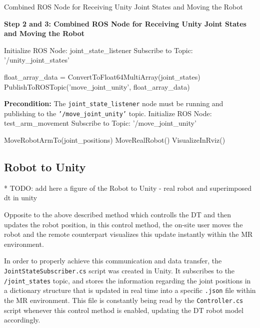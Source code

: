 \begin{algorithm}
    \caption{Combined ROS Node for Receiving Unity Joint States and Moving the Robot}\label{alg:combined_ros_node}
    \begin{algorithmic}[1]
        \State \textbf{Step 2 and 3: Combined ROS Node for Receiving Unity Joint States and Moving the Robot}
        
        \State Initialize ROS Node: joint\_state\_listener
        \State Subscribe to Topic: '/unity\_joint\_states'
        
            \State float\_array\_data = ConvertToFloat64MultiArray(joint\_states)
            \State PublishToROSTopic('move\_joint\_unity', float\_array\_data)
        \EndWhile
        
        \State \textbf{Precondition:} The \texttt{joint\_state\_listener} node must be running and publishing to the \texttt{'/move\_joint\_unity'} topic.
        \State Initialize ROS Node: test\_arm\_movement
        \State Subscribe to Topic: '/move\_joint\_unity'
        
            \State MoveRobotArmTo(joint\_positions)
                \State MoveRealRobot()
            \Else
                \State VisualizeInRviz()
            \EndIf
        \EndWhile
    \end{algorithmic}
\end{algorithm}


    
\subsection{Robot to Unity}
* TODO: add here a figure of the Robot to Unity - real robot and superimposed dt in unity

Opposite to the above described method which controlls the \ac{DT} and then updates the robot position, in this control method, the on-site user moves the robot and the remote counterpart visualizes this update instantly within the \ac{MR} environment.

In order to properly achieve this communication and data transfer, the \texttt{JointStateSubscriber.cs} script was created in Unity. It subscribes to the \texttt{/joint\_states} topic, and stores the information regarding the joint positions in a dictionary structure that is updated in real time into a specific \texttt{.json} file within the \ac{MR} environment. This file is constantly being read by the \texttt{Controller.cs} script whenever this control method is enabled, updating the \ac{DT} robot model accordingly.

